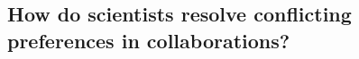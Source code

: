 \documentclass[10pt]{beamer}
\begin{document}
\subsection{How do scientists resolve conflicting preferences in collaborations?}

\end{document}
